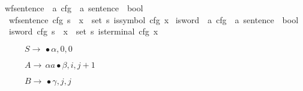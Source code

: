 \begin{isabellebody}
\isanewline
{}\isamarkupfalse%
\ wf{\isacharunderscore}{\kern0pt}sentence\ {\isacharcolon}{\kern0pt}{\isacharcolon}{\kern0pt}\ {\isachardoublequoteopen}{\isacharprime}{\kern0pt}a\ cfg\ {\isasymRightarrow}\ {\isacharprime}{\kern0pt}a\ sentence\ {\isasymRightarrow}\ bool{\isachardoublequoteclose}\ \isanewline
\ \ {\isachardoublequoteopen}wf{\isacharunderscore}{\kern0pt}sentence\ cfg\ s\ {\isacharequal}{\kern0pt}\ {\isacharparenleft}{\kern0pt}{\isasymforall}x\ {\isasymin}\ set\ s{\isachardot}{\kern0pt}\ is{\isacharunderscore}{\kern0pt}symbol\ cfg\ x{\isacharparenright}{\kern0pt}{\isachardoublequoteclose}\isanewline
\isanewline
{}\isamarkupfalse%
\ is{\isacharunderscore}{\kern0pt}word\ {\isacharcolon}{\kern0pt}{\isacharcolon}{\kern0pt}\ {\isachardoublequoteopen}{\isacharprime}{\kern0pt}a\ cfg\ {\isasymRightarrow}\ {\isacharprime}{\kern0pt}a\ sentence\ {\isasymRightarrow}\ bool{\isachardoublequoteclose}\ \isanewline
\ \ {\isachardoublequoteopen}is{\isacharunderscore}{\kern0pt}word\ cfg\ s\ {\isacharequal}{\kern0pt}\ {\isacharparenleft}{\kern0pt}{\isasymforall}x\ {\isasymin}\ set\ s{\isachardot}{\kern0pt}\ is{\isacharunderscore}{\kern0pt}terminal\ cfg\ x{\isacharparenright}{\kern0pt}{\isachardoublequoteclose}%
\isadelimdocument
%
\endisadelimdocument
%
\isatagdocument
%
\isamarkuptrue%
%
\endisatagdocument
{\isafolddocument}%
%
\isadelimdocument
%
\endisadelimdocument
%
\begin{isamarkuptext}%
\begin{figure}[htpb]
    \centering

    \begin{mathpar}
      \inferrule [Init]
      {\\}
      {$S \rightarrow \, \bullet\alpha, 0, 0$}
  
      {$A \rightarrow \, \alpha a \bullet \beta, i, j+1$}
  
      {$B \rightarrow \, \bullet \gamma, j, j$}
  

\end{mathpar}
\end{figure}
\end{isamarkuptext}
\end{isabellebody}
